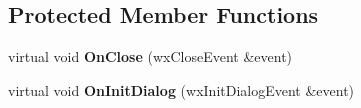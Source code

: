 \subsection*{Protected Member Functions}
\begin{DoxyCompactItemize}
\item 
\hypertarget{class_dlg_options_aad6cf9d439aced63416da6dc04f326d7}{virtual void {\bfseries On\-Close} (wx\-Close\-Event \&event)}\label{class_dlg_options_aad6cf9d439aced63416da6dc04f326d7}

\item 
\hypertarget{class_dlg_options_ab293c5e4e64e5d2de1b9d1ee67e3a448}{virtual void {\bfseries On\-Init\-Dialog} (wx\-Init\-Dialog\-Event \&event)}\label{class_dlg_options_ab293c5e4e64e5d2de1b9d1ee67e3a448}

\end{DoxyCompactItemize}
